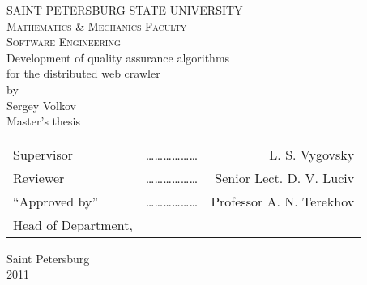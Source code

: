 \documentclass[a4paper,10pt]{report}
\begin{document}
\begin{titlepage}
\begin{center}
\begin{otherlanguage}{english}

\textsc{SAINT PETERSBURG STATE UNIVERSITY}\\
\textsc{Mathematics \& Mechanics Faculty}\\[1.0cm]

\textsc{Software Engineering}\\[3.0cm]

{ \LARGE Development of quality assurance algorithms}\\[1.0cm]

{ \LARGE for the distributed web crawler}\\[1.0cm]

{by \\ Sergey Volkov \\ Master’s thesis}\\[3.0cm]

\begin{tabular}{lcr}
Supervisor & ……………… & L. S. Vygovsky \\[1.0cm]
Reviewer            & ……………… & Senior Lect. D. V. Luciv\\[1.0cm]
``Approved by'' & ……………… & Professor A. N. Terekhov\\
Head of Department, & & \\
\end{tabular}

\vfill

{\large Saint Petersburg \\ 2011}

\end{otherlanguage}
\end{center}
\end{titlepage}

\tableofcontents






\end{document}
